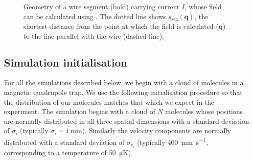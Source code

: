 \begin{figure}[h]
\centering
  \caption{Geometry of a wire segment (bold) carrying current $I$, whose field
  can be calculated using . The dotted line
  shows $s_\text{seg}(\mathbf{q})$, the shortest distance from the point at
  which the field is calculated ($\mathbf{q}$) to the line parallel with the
  wire (dashed line).
  }
  \label{sim:fig:wiresegment}
\end{figure}


\subsection{Simulation initialisation}
\label{sim:sim:init}

For all the simulations described below, we begin with a cloud of molecules in
a magnetic quadrupole trap. We use the following initialisation procedure so
that the distribution of our molecules matches that which we expect in the
experiment. 
%
The simulation begins with a cloud of $N$ molecules whose positions are normally distributed
in all three spatial dimensions with a standard deviation of $\sigma_i$
(typically $\sigma_i = \SI{1}{\milli\meter}$). Similarly the velocity components
are normally distributed with a standard deviation of $\sigma_{v_i}$ (typically
\SI{400}{\milli\meter\per\second}, corresponding to a temperature of
\SI{50}{\micro\kelvin}). 

